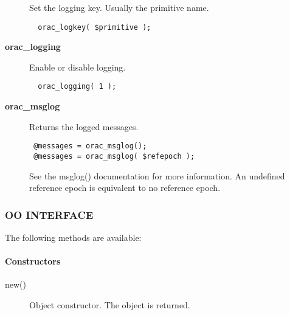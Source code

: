 \begin{description}
Set the logging key. Usually the primitive name.

\begin{verbatim}
  orac_logkey( $primitive );
\end{verbatim}

\item[{\textbf{orac\_logging}}] \mbox{}

Enable or disable logging.

\begin{verbatim}
  orac_logging( 1 );
\end{verbatim}

\item[{\textbf{orac\_msglog}}] \mbox{}

Returns the logged messages.

\begin{verbatim}
 @messages = orac_msglog();
 @messages = orac_msglog( $refepoch );
\end{verbatim}


See the msglog() documentation for more information. An undefined reference
epoch is equivalent to no reference epoch.

\end{description}
\subsubsection*{OO INTERFACE\label{ORAC::Print_OO_INTERFACE}}


The following methods are available:

\paragraph*{Constructors\label{ORAC::Print_Constructors}}
\begin{description}

\item[{new()}] \mbox{}

Object constructor. The object is returned.

\end{description}
